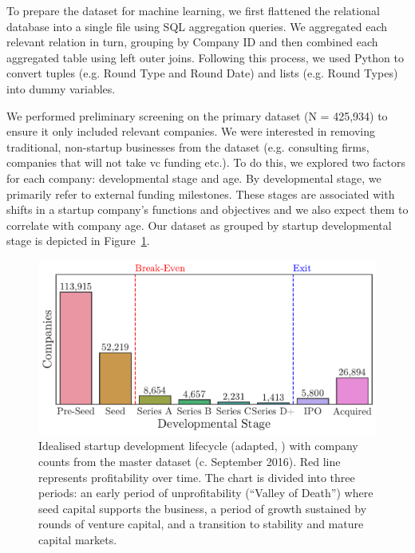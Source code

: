 \documentclass[../thesis/thesis.tex]{subfiles}
\begin{document}
To prepare the dataset for machine learning, we first flattened the relational database into a single file using SQL aggregation queries. We aggregated each relevant relation in turn, grouping by Company ID and then combined each aggregated table using left outer joins. Following this process, we used Python to convert tuples (e.g. Round Type and Round Date) and lists (e.g. Round Types) into dummy variables.

We performed preliminary screening on the primary dataset (N = 425,934) to ensure it only included relevant companies. We were interested in removing traditional, non-startup businesses from the dataset (e.g. consulting firms, companies that will not take \gls{vc} funding etc.). To do this, we explored two factors for each company: developmental stage and age. By developmental stage, we primarily refer to external funding milestones. These stages are associated with shifts in a startup company's functions and objectives and we also expect them to correlate with company age. Our dataset as grouped by startup developmental stage is depicted in Figure~\ref{fig:design:lifecycle}.

\begin{figure}[!htb]
    \centering
    \includegraphics[width=\textwidth]{../figures/design/lifecycle}
    \caption[Startup development lifecyle]{Idealised startup development lifecycle (adapted, \cite{}) with company counts from the master dataset (c. September 2016). Red line represents profitability over time. The chart is divided into three periods: an early period of unprofitability (``Valley of Death'') where seed capital supports the business, a period of growth sustained by rounds of venture capital, and a transition to stability and mature capital markets.}
    \label{fig:design:lifecycle}
\end{figure}
\end{document}
